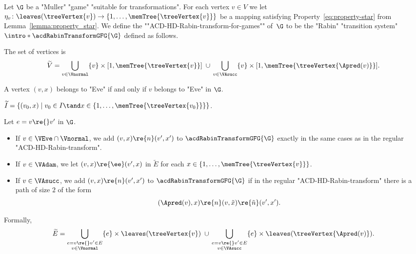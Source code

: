 \documentclass{theoretics}
\begin{document}
\begin{definition}\label{def-ACD:RabinGFGTransformationACD}
	Let $\G$ be a "Muller" "game" "suitable for transformations". 
 	For each vertex $v\in V$ we let $\eta_v \colon \leaves(\treeVertex{v}) \to \{1,\dots, \memTree{\treeVertex{v}}\}$ be a mapping satisfying Property~\eqref{eq:property-star} from Lemma~\ref{lemma:property_star}.	
 	\AP We define the ""ACD-HD-Rabin-transform-for-games"" of~$\G$ to be the "Rabin" "transition system" $\intro*\acdRabinTransformGFG{\G}$ %
 	defined as follows.
 	\begin{description}
 		\setlength\itemsep{2mm}
 		\item[Vertices.] The set of vertices is \[\widetilde{V} = \bigcup_{v\in \Vnormal}  \{v\} \times [1,\memTree{\treeVertex{v}}]  \;\cup\, \bigcup_{v\in \VAsucc}  \{v\} \times [1,\memTree{\treeVertex{\Apred(v)}}] .\]
 		
 		\item[Players partition.] A vertex $(v,x)$ belongs to "Eve" if and only if $v$ belongs to "Eve" in $\G$.
 		
 		\item[Initial vertices.] $\widetilde{I} = \{ (v_0, x) \mid v_0\in I \tand x \in \{1,\dots, \memTree{\treeVertex{v_0}}\} \}$.
 		
 		\item[Edges and output colours.] %
 		Let $e = v\re{} v'$ in $\G$.
 		\begin{itemize}
 			\item 	If $v\in \VEve\cap \Vnormal$, we add $(v, x) \re{n} (v',x')$ to $\acdRabinTransformGFG{\G}$ exactly in the same cases as in the regular "ACD-HD-Rabin-transform".
 			\item If $v\in \VAdam$, we let $(v,x)\re{\ee}(v',x)$ in $\widetilde{E}$ for each $x\in \{1,\dots, \memTree{\treeVertex{v}}\}$. 
 			\item If $v\in \VAsucc$, we add $(v, x) \re{n} (v',x')$ to $\acdRabinTransformGFG{\G}$ if in the regular "ACD-HD-Rabin-transform" there is a path of size $2$ of the form 
 			\[ (\Apred(v),x)\re{n} (v, \tilde{x}) \re{\tilde{n}} (v',x').  \]
 		\end{itemize}
 			Formally, \[\widetilde{E} = \bigcup_{\substack{e=v\re{}v'\in E\\ v\in \Vnormal}}  \{e\} \times \leaves(\treeVertex{v}) \;\cup\, \bigcup_{\substack{e=v\re{}v'\in E\\v\in \VAsucc}}  \{e\} \times \leaves(\treeVertex{\Apred(v)}).\]
 		

\end{description}
\end{definition}
\end{document}
